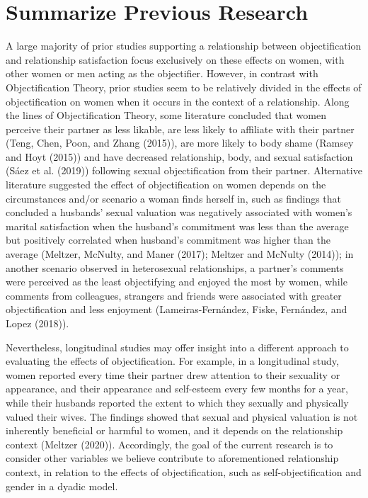 \documentclass[
  english,
  man]{apa6}
\begin{document}
\hypertarget{summarize-previous-research}{%
\section{Summarize Previous Research}\label{summarize-previous-research}}

A large majority of prior studies supporting a relationship between objectification and relationship satisfaction focus exclusively on these effects on women, with other women or men acting as the objectifier. However, in contrast with Objectification Theory, prior studies seem to be relatively divided in the effects of objectification on women when it occurs in the context of a relationship. Along the lines of Objectification Theory, some literature concluded that women perceive their partner as less likable, are less likely to affiliate with their partner (Teng, Chen, Poon, and Zhang (2015)), are more likely to body shame (Ramsey and Hoyt (2015)) and have decreased relationship, body, and sexual satisfaction (Sáez et al. (2019)) following sexual objectification from their partner. Alternative literature suggested the effect of objectification on women depends on the circumstances and/or scenario a woman finds herself in, such as findings that concluded a husbands' sexual valuation was negatively associated with women's marital satisfaction when the husband's commitment was less than the average but positively correlated when husband's commitment was higher than the average (Meltzer, McNulty, and Maner (2017); Meltzer and McNulty (2014)); in another scenario observed in heterosexual relationships, a partner's comments were perceived as the least objectifying and enjoyed the most by women, while comments from colleagues, strangers and friends were associated with greater objectification and less enjoyment (Lameiras-Fernández, Fiske, Fernández, and Lopez (2018)).

Nevertheless, longitudinal studies may offer insight into a different approach to evaluating the effects of objectification. For example, in a longitudinal study, women reported every time their partner drew attention to their sexuality or appearance, and their appearance and self-esteem every few months for a year, while their husbands reported the extent to which they sexually and physically valued their wives. The findings showed that sexual and physical valuation is not inherently beneficial or harmful to women, and it depends on the relationship context (Meltzer (2020)). Accordingly, the goal of the current research is to consider other variables we believe contribute to aforementioned relationship context, in relation to the effects of objectification, such as self-objectification and gender in a dyadic model.
\end{document}
